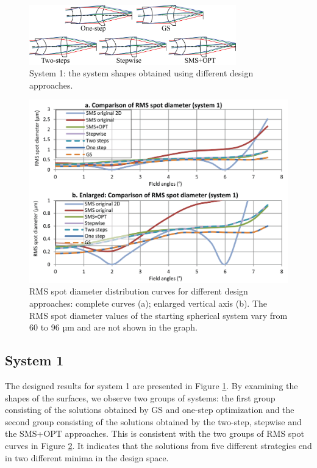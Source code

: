 \begin{figure}[h!]
    \centering
    \includegraphics[width=0.8\textwidth]{chapter-5/figures/Figure5_system_plot.png}
    \caption{System 1: the system shapes obtained using different design approaches.}
    \label{fig: fig5_case1_systemplot}
\end{figure}


\begin{figure}[h!]
    \centering
    \includegraphics[width=1\textwidth]{chapter-5/figures/Figure6_case1_rmsCurve.png}
    \caption{RMS spot diameter distribution curves for different design approaches: complete curves (a); enlarged vertical axis (b). The RMS spot diameter values of the starting spherical system vary from 60 to 96 µm and are not shown in the graph.}
    \label{fig: fig6_case1_RMScompare}
\end{figure}
\subsection{System 1}
The designed results for system 1 are presented in Figure \ref{fig: fig5_case1_systemplot}. By examining the shapes of the surfaces, we observe two groups of systems: the first group consisting of the solutions obtained by GS and one-step optimization and the second group consisting of the solutions obtained by the two-step, stepwise and the SMS+OPT approaches. This is consistent with the two groups of RMS spot curves in Figure \ref{fig: fig6_case1_RMScompare}. It indicates that the solutions from five different strategies end in two different minima in the design space.

